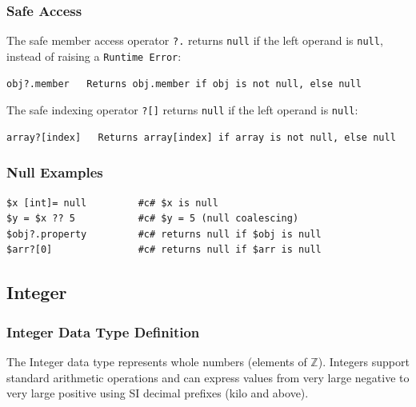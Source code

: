 \subsubsection{Safe Access}
The safe member access operator \texttt{?.} returns \texttt{null} if the left operand is \texttt{null}, instead of raising a \texttt{Runtime Error}:
\begin{verbatim}
obj?.member   Returns obj.member if obj is not null, else null
\end{verbatim}

The safe indexing operator \texttt{?[]} returns \texttt{null} if the left operand is \texttt{null}:
\begin{verbatim}
array?[index]   Returns array[index] if array is not null, else null
\end{verbatim}

\subsubsection{Null Examples}
\begin{verbatim}
$x [int]= null         #c# $x is null
$y = $x ?? 5           #c# $y = 5 (null coalescing)
$obj?.property         #c# returns null if $obj is null
$arr?[0]               #c# returns null if $arr is null
\end{verbatim}

\subsection{Integer}
\subsubsection{Integer Data Type Definition}
The Integer data type represents whole numbers (elements of $\mathbb{Z}$). Integers support standard arithmetic operations and can express values from very large negative to very large positive using SI decimal prefixes (kilo and above).

